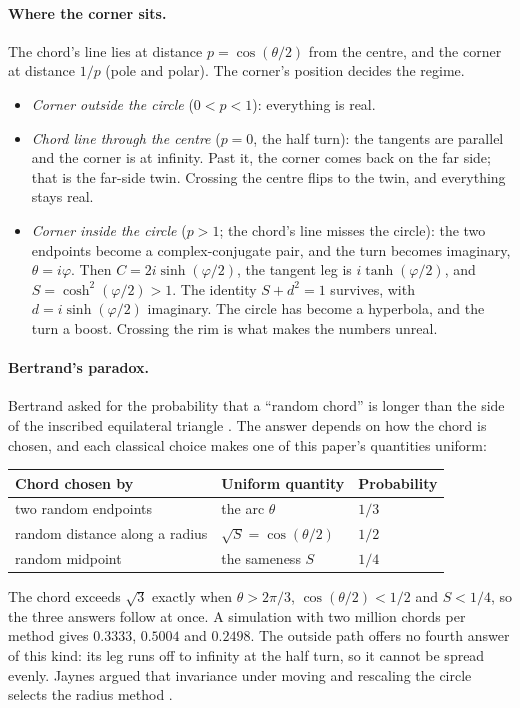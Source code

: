 \documentclass[11pt]{article}
\begin{document}
\paragraph{Where the corner sits.} The chord's line lies at distance $p=\cos(\theta/2)$
from the centre, and the corner at distance $1/p$ (pole and polar). The corner's
position decides the regime.
\begin{itemize}
  \item \emph{Corner outside the circle} ($0<p<1$): everything is real.
  \item \emph{Chord line through the centre} ($p=0$, the half turn): the tangents are
    parallel and the corner is at infinity. Past it, the corner comes back on the far side;
    that is the far-side twin. Crossing the centre flips to the twin, and everything stays real.
  \item \emph{Corner inside the circle} ($p>1$; the chord's line misses the circle): the
    two endpoints become a complex-conjugate pair, and the turn becomes imaginary,
    $\theta=i\varphi$. Then $C=2i\sinh(\varphi/2)$, the tangent leg is $i\tanh(\varphi/2)$, and
    $S=\cosh^2(\varphi/2)>1$. The identity $S+d^2=1$ survives, with $d=i\sinh(\varphi/2)$
    imaginary. The circle has become a hyperbola, and the turn a boost. Crossing the rim is
    what makes the numbers unreal.
\end{itemize}

\paragraph{Bertrand's paradox.} Bertrand asked for the probability that a ``random chord''
is longer than the side of the inscribed equilateral triangle \cite{bertrand}. The answer
depends on how the chord is chosen, and each classical choice makes one of this paper's
quantities uniform:
\begin{center}\small
\begin{tabular}{lll}\toprule
Chord chosen by & Uniform quantity & Probability \\ \midrule
two random endpoints & the arc $\theta$ & $1/3$ \\
random distance along a radius & $\sqrt S=\cos(\theta/2)$ & $1/2$ \\
random midpoint & the sameness $S$ & $1/4$ \\
\bottomrule\end{tabular}
\end{center}
The chord exceeds $\sqrt3$ exactly when $\theta>2\pi/3$, $\cos(\theta/2)<1/2$ and $S<1/4$, so
the three answers follow at once. A simulation with two million chords per method gives
$0.3333$, $0.5004$ and $0.2498$. The outside path offers no fourth answer of this kind: its leg runs off to
infinity at the half turn, so it cannot be spread evenly. Jaynes argued that invariance
under moving and rescaling the circle selects the radius method \cite{jaynes}.
\end{document}
